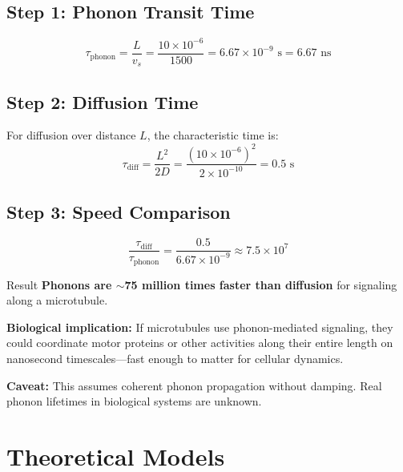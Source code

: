 \subsection*{Step 1: Phonon Transit Time}

\begin{equation}
\tau_{\text{phonon}} = \frac{L}{v_s} = \frac{10 \times 10^{-6}}{1500} = 6.67 \times 10^{-9} \text{ s} = 6.67 \text{ ns}
\label{eq:phonon-transit}
\end{equation}

\subsection*{Step 2: Diffusion Time}

For diffusion over distance $L$, the characteristic time is:
\begin{equation}
\tau_{\text{diff}} = \frac{L^2}{2D} = \frac{(10 \times 10^{-6})^2}{2 \times 10^{-10}} = 0.5 \text{ s}
\label{eq:diffusion-time}
\end{equation}

\subsection*{Step 3: Speed Comparison}

\begin{equation}
\frac{\tau_{\text{diff}}}{\tau_{\text{phonon}}} = \frac{0.5}{6.67 \times 10^{-9}} \approx 7.5 \times 10^{7}
\label{eq:speed-ratio}
\end{equation}

\begin{calloutbox}[colback=black!8!white,colframe=black]{Result}
\textbf{Phonons are $\sim$75 million times faster than diffusion} for signaling along a microtubule.

\textbf{Biological implication:} If microtubules use phonon-mediated signaling, they could coordinate motor proteins or other activities along their entire length on nanosecond timescales---fast enough to matter for cellular dynamics.

\textbf{Caveat:} This assumes coherent phonon propagation without damping. Real phonon lifetimes in biological systems are unknown.
\end{calloutbox}

\section{Theoretical Models}

